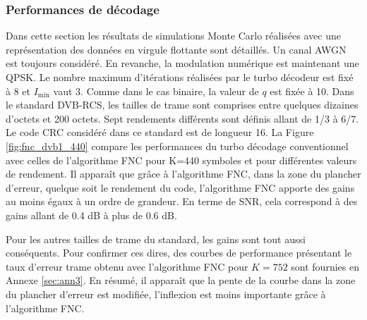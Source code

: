 \subsubsection{Performances de décodage}
Dans cette section les résultats de simulations Monte Carlo réalisées avec une représentation des données en virgule
flottante sont détaillés. Un canal AWGN est toujours considéré. En revanche, la modulation numérique est maintenant une QPSK. Le 
nombre maximum d'itérations réalisées par le turbo décodeur est fixé à 8 et $I_{\text{min}}$ vaut 3.
Comme dans le cas binaire, la valeur de $q$ est fixée à 10. Dans le standard DVB-RCS, les tailles de trame sont comprises
entre quelques dizaines d'octets et 200 octets. Sept rendements différents sont définis allant de 1/3 à 6/7. Le code CRC 
considéré dans ce standard est de longueur 16. La Figure \ref{fig:fnc_dvb1_440} compare les performances du turbo décodage
conventionnel avec celles de l'algorithme FNC pour K=440 symboles et pour différentes valeurs de rendement. 
Il apparaît que grâce à l'algorithme FNC, dans la zone du plancher d'erreur, quelque soit le rendement du code, l'algorithme FNC apporte 
des gains au moins égaux à un ordre de grandeur. 
En terme de SNR, cela correspond à des gains allant de 0.4 dB à plus de 
0.6 dB.

Pour les autres tailles de trame du standard, les gains sont tout aussi conséquents. Pour confirmer ces
dires, des courbes de performance présentant le taux d'erreur trame obtenu avec l'algorithme FNC pour $K=752$ sont fournies en 
Annexe \ref{sec:ann3}. En résumé, il apparaît que la pente de la courbe dans la zone du plancher d'erreur est modifiée, l'inflexion
est moins importante grâce à l'algorithme FNC.

